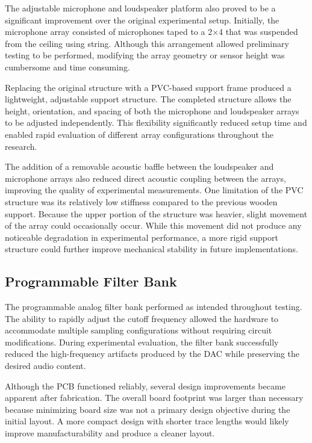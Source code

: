 The adjustable microphone and loudspeaker platform also proved to be a significant improvement over the original experimental setup. Initially, the microphone array consisted of microphones taped to a 2$\times$4 that was suspended from the ceiling using string. Although this arrangement allowed preliminary testing to be performed, modifying the array geometry or sensor height was cumbersome and time consuming.

Replacing the original structure with a PVC-based support frame produced a lightweight, adjustable support structure. The completed structure allows the height, orientation, and spacing of both the microphone and loudspeaker arrays to be adjusted independently. This flexibility significantly reduced setup time and enabled rapid evaluation of different array configurations throughout the research.

The addition of a removable acoustic baffle between the loudspeaker and microphone arrays also reduced direct acoustic coupling between the arrays, improving the quality of experimental measurements. One limitation of the PVC structure was its relatively low stiffness compared to the previous wooden support. Because the upper portion of the structure was heavier, slight movement of the array could occasionally occur. While this movement did not produce any noticeable degradation in experimental performance, a more rigid support structure could further improve mechanical stability in future implementations.

\subsection{Programmable Filter Bank}

The programmable analog filter bank performed as intended throughout testing. The ability to rapidly adjust the cutoff frequency allowed the hardware to accommodate multiple sampling configurations without requiring circuit modifications. During experimental evaluation, the filter bank successfully reduced the high-frequency artifacts produced by the DAC while preserving the desired audio content.

Although the PCB functioned reliably, several design improvements became apparent after fabrication. The overall board footprint was larger than necessary because minimizing board size was not a primary design objective during the initial layout. A more compact design with shorter trace lengths would likely improve manufacturability and produce a cleaner layout.

